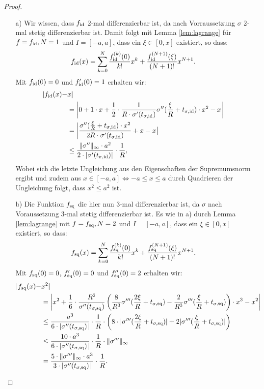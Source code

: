 \begin{proof}
	\begin{itemize}
  	\item[a)] Wir wissen, dass $f_{\mathrm{id}}$ 2-mal differenzierbar ist, da nach Vorraussetzung $\sigma$ 2-mal stetig differenzierbar ist. Damit folgt mit Lemma \ref{lem:lagrange} für $f = f_{\mathrm{id}}, N = 1$ und $I = [-a, a]$, dass ein $\xi \in [0, x]$ existiert, so dass:
$$f_{\mathrm{id}}(x) = \sum_{k = 0}^N \frac{f_{\mathrm{id}}^{(k)}(0)}{k!}x^k + \frac{f_{\mathrm{id}}^{(N + 1)}(\xi)}{(N + 1)!}x^{N + 1}.$$
Mit $f_{\mathrm{id}}(0) = 0$ und $f_{\mathrm{id}}'(0) = 1$ erhalten wir:
  	\begin{equation*}
  	\begin{split}
  	 |f_{\mathrm{id}}(x) -  & x| \\
  	& = \bigg|0 + 1 \cdot x + \frac{1}{2} \cdot \frac{1}{R \cdot \sigma'(t_{\sigma,\mathrm{id}})} \sigma''(\frac{\xi}{R} + t_{\sigma,\mathrm{id}}) \cdot x^2 - x \bigg| \\
  	& = \bigg| \frac{\sigma''(\frac{\xi}{R} + t_{\sigma,\mathrm{id}})  \cdot x^2}{2R \cdot \sigma'(t_{\sigma, \mathrm{id}})} + x - x\big| \\
  	& \leq \frac{\| \sigma'' \|_{\infty} \cdot a^2}{2 \cdot |\sigma'(t_{\sigma, \mathrm{id}})|} \cdot \frac{1}{R},  
  	\end{split}
  	\end{equation*}
  	Wobei sich die letzte Ungleichung aus den Eigenschaften der Supremumsnorm ergibt und zudem aus $x \in [-a,a] \Leftrightarrow -a \leq x \leq a$ durch Quadrieren der Ungleichung folgt, dass $x^2 \leq a^2$ ist.
  	\item[b)]  Die Funktion $f_{\mathrm{sq}}$ die hier nun 3-mal differenzierbar ist, da $\sigma$ nach Voraussetzung  3-mal stetig differenzierbar ist. Es wie in a) durch Lemma \ref{lem:lagrange} mit $f = f_{\mathrm{sq}}, N = 2$ und $I = [-a, a]$, dass ein $\xi \in [0, x]$ existiert, so dass:
$$f_{\mathrm{sq}}(x) = \sum_{k = 0}^N \frac{f_{\mathrm{sq}}^{(k)}(0)}{k!}x^k + \frac{f_{\mathrm{sq}}^{(N + 1)}(\xi)}{(N + 1)!}x^{N + 1}.$$
Mit $f_{\mathrm{sq}}(0) = 0$, $f_{\mathrm{sq}}'(0) = 0$ und $f_{\mathrm{sq}}''(0) = 2$ erhalten wir:
\begin{equation*}
  	\begin{split}
  	 |f_{\mathrm{sq}}(x) -  & x^2| \\
  	& = \bigg|x^2 + \frac{1}{6} \cdot \frac{R^2}{\sigma''(t_{\sigma,\mathrm{sq}})} \left(\frac{8}{R^3}\sigma'''(\frac{2\xi}{R} + t_{\sigma,\mathrm{sq}}) - \frac{2}{R^3} \sigma'''(\frac{\xi}{R} + t_{\sigma,\mathrm{sq}})\right) \cdot x^3 - x^2\bigg| \\
  	& \leq \frac{a^3}{6 \cdot |\sigma''(t_{\sigma,\mathrm{sq}})|} \cdot \frac{1}{R} \cdot \left(8 \cdot |\sigma'''(\frac{2\xi}{R} + t_{\sigma,\mathrm{sq}})| + 2 |\sigma'''(\frac{\xi}{R} + t_{\sigma,\mathrm{sq}})|\right) \\
  	& \leq \frac{10 \cdot a^3}{6 \cdot |\sigma''(t_{\sigma,\mathrm{sq}})|} \cdot \frac{1}{R} \cdot \|\sigma'''\|_{\infty} \\
  	& = \frac{5 \cdot \|\sigma'''\|_{\infty} \cdot a^3}{3 \cdot |\sigma''(t_{\sigma, \mathrm{sq}})|} \cdot \frac{1}{R}. 
  	\end{split}
  	\end{equation*}
 	\end{itemize}
\end{proof}

